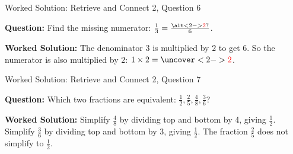 \documentclass{beamer}
\newcommand{\ashow}[1]{\uncover<2->{\textcolor{red}{\small #1}}}
\newcommand{\ashowq}[1]{\alt<2->{\textcolor{red}{\small #1}}{?}}
\begin{document}
\begin{frame}{Worked Solution: Retrieve and Connect 2, Question 6}

\textbf{Question:} Find the missing numerator: $\frac{1}{3} = \frac{\ashowq{2}}{6}$.

\textbf{Worked Solution:} The denominator $3$ is multiplied by $2$ to get $6$. So the numerator is also multiplied by $2$: $1 \times 2 = \ashow{2}$. \ashow{The missing numerator is 2.}
\end{frame}

\begin{frame}{Worked Solution: Retrieve and Connect 2, Question 7}

\textbf{Question:} Which two fractions are equivalent: $\frac{1}{2}, \frac{2}{5}, \frac{4}{8}, \frac{3}{6}$?

\textbf{Worked Solution:} Simplify $\frac{4}{8}$ by dividing top and bottom by 4, giving $\frac12$. Simplify $\frac{3}{6}$ by dividing top and bottom by 3, giving $\frac12$. The fraction $\frac25$ does not simplify to $\frac12$. \ashow{$\frac{1}{2}=\frac{4}{8}=\frac{3}{6}$.}
\end{frame}
\end{document}
